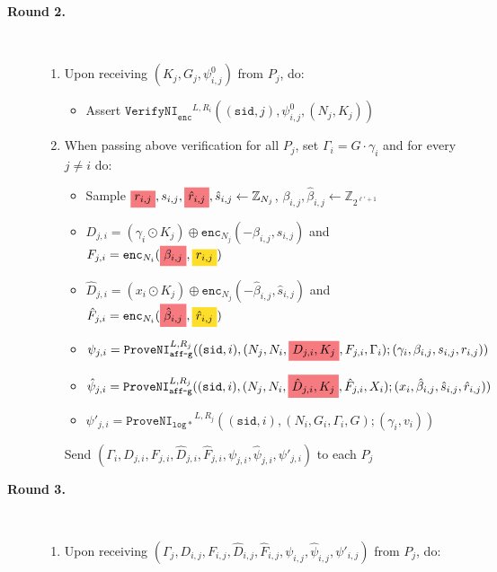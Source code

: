 \documentclass[11pt]{article}
\newcommand{\enci}[1]{\ensuremath{\mathtt{enc}_{N_{#1}}}}
\newcommand{\sid}{\ensuremath{\mathtt{sid}}}
\newcommand{\proveni}[1]{\ensuremath{\mathtt{ProveNI}_{\mathtt{#1}}}}
\newcommand{\verifyni}[1]{\ensuremath{\mathtt{VerifyNI}_{\mathtt{#1}}}}
\newcommand{\changed}[1]{\colorbox{Salmon}{$\displaystyle #1$}}
\newcommand{\note}[1]{\colorbox{Goldenrod}{$\displaystyle #1$}}
\newcommand{\Z}{\mathbb{Z}}
\newcommand{\?}[1]{\stackrel{?}{#1}}
\begin{document}
{\begin{description}
    \item[\textbf{Round 2.}] \
    \begin{enumerate}
        \item Upon receiving $(K_j, G_j, \psi^0_{i,j})$ from $P_j$, do:
            \begin{itemize}
                \item Assert $\verifyni{enc}^{L,R_i}((\sid, j), \psi^0_{i,j}, (N_j, K_j))$ 
            \end{itemize}
        \item When passing above verification for all $P_j$, set $\Gamma_i = G \cdot \gamma_i$ and for every $j \ne i$ do:
        \begin{itemize}
            \item Sample $\changed{r_{i,j}}, s_{i,j}, \changed{\hat{r}_{i,j}}, \hat{s}_{i,j} \gets \Z_{N_j}$,
                $\beta_{i,j}, \hat{\beta}_{i,j} \gets \Z_{2^{\ell' + 1}}$
            \item $D_{j,i} = (\gamma_i \odot K_j) \oplus \enci{j}(-\beta_{i,j}, s_{i,j})$
                and $F_{j,i} = \enci{i}(\changed{\beta_{i,j}}, \note{r_{i,j}})$
            \item $\hat{D}_{j,i} = (x_i \odot K_j) \oplus \enci{j}(-\hat{\beta}_{i,j}, \hat{s}_{i,j})$
                and $\hat{F}_{j,i} = \enci{i}(\changed{\hat{\beta}_{i,j}}, \note{\hat{r}_{i,j}})$
            \item $\psi_{j,i} = \proveni{aff\mbox{-}g}^{L,R_j}((\sid, i), (N_j, N_i, \changed{D_{j,i}, K_j}, F_{j,i}, \Gamma_i); (\gamma_i, \beta_{i,j}, s_{i,j}, r_{i,j}))$
            \item $\hat{\psi}_{j,i} = \proveni{aff\mbox{-}g}^{L,R_j}((\sid, i), (N_j, N_i, \changed{\hat{D}_{j,i}, K_j}, \hat{F}_{j,i}, X_i); (x_i, \hat{\beta}_{i,j}, \hat{s}_{i,j}, \hat{r}_{i,j}))$
            \item $\psi'_{j,i} = \proveni{log*}^{L,R_j}((\sid, i), (N_i, G_i, \Gamma_i, G); (\gamma_i, v_i))$
        \end{itemize}
        Send $(\Gamma_i, D_{j,i}, F_{j,i}, \hat{D}_{j,i}, \hat{F}_{j,i}, \psi_{j,i}, \hat{\psi}_{j,i}, \psi'_{j,i})$
        to each $P_j$
    \end{enumerate}

    \item[\textbf{Round 3.}] \ 
    \begin{enumerate}
        \item Upon receiving $(\Gamma_j, D_{i,j}, F_{i,j}, \hat{D}_{i,j}, \hat{F}_{i,j}, \psi_{i,j}, \hat{\psi}_{i,j}, \psi'_{i,j})$ from $P_j$, do:


\end{enumerate}
\end{description}}
\end{document}
